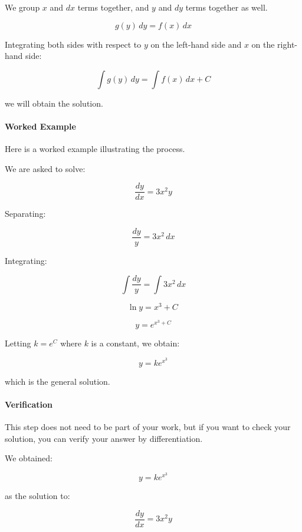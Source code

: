 We group $x$ and $dx$ terms together, and $y$ and $dy$ terms together as well.

$$g(y)\, dy = f(x)\, dx$$



Integrating both sides with respect to $y$ on the left-hand side and $x$ on the right-hand side:

$$\int g(y)\,dy = \int f(x)\,dx + C$$



we will obtain the solution.



\paragraph{Worked Example}

Here is a worked example illustrating the process.



We are asked to solve:

$$\frac{dy}{dx} = 3x^2y$$



Separating:

$$\frac{dy}{y} = 3x^2\, dx$$



Integrating:

$$\int \frac{dy}{y} = \int 3x^2\, dx$$

$$\ln{y} = x^3 + C \,$$

$$y = e^{x^3 + C}$$



Letting $k = e^C$ where $k$ is a constant, we obtain:

$$y = ke^{x^3}$$



which is the general solution.



\paragraph{Verification}

This step does not need to be part of your work, but if you want to check your solution, you can verify your answer by differentiation.



We obtained:

$$y = ke^{x^3}$$



as the solution to:

$$\frac{dy}{dx} = 3x^2y$$



